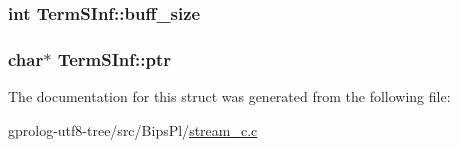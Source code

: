 \subsubsection[{\texorpdfstring{buff\+\_\+size}{buff_size}}]{\setlength{\rightskip}{0pt plus 5cm}int Term\+S\+Inf\+::buff\+\_\+size}\hypertarget{structTermSInf_aa2ac007b499e0cb03e17072299872d08}{}\label{structTermSInf_aa2ac007b499e0cb03e17072299872d08}
\subsubsection[{\texorpdfstring{ptr}{ptr}}]{\setlength{\rightskip}{0pt plus 5cm}char$\ast$ Term\+S\+Inf\+::ptr}\hypertarget{structTermSInf_a46ab1bf8caba7bd0044429601be6b670}{}\label{structTermSInf_a46ab1bf8caba7bd0044429601be6b670}


The documentation for this struct was generated from the following file\+:\begin{DoxyCompactItemize}
\item 
gprolog-\/utf8-\/tree/src/\+Bips\+Pl/\hyperlink{stream__c_8c}{stream\+\_\+c.\+c}\end{DoxyCompactItemize}
